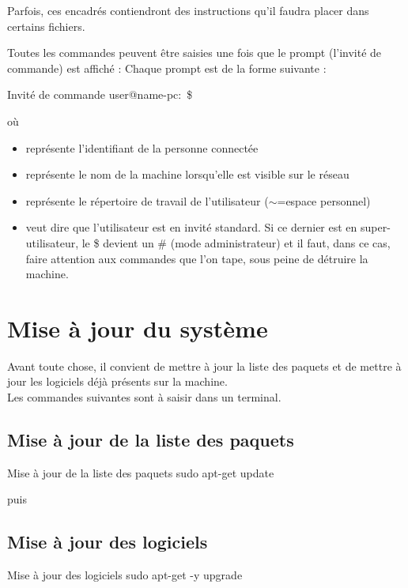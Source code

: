 Parfois, ces encadrés contiendront des instructions qu'il faudra placer dans certains fichiers.

Toutes les commandes peuvent être saisies une fois que le prompt (l’invité de commande) est affiché : 
Chaque prompt est de la forme suivante : \\
\begin{Bash}{Invité de commande}
user@name-pc:~\$ 
\end{Bash}


où 	

\begin{itemize}
    \item {} représente l’identifiant de la personne connectée
    \item {} représente le nom de la machine lorsqu’elle est visible sur le réseau
    \item \bold{$\sim$} représente le répertoire de travail de l’utilisateur ($\sim$=espace personnel)
    \item \bold{\$} veut dire que l'utilisateur est en invité standard. Si ce dernier est en  
super-utilisateur, le \$ devient un \# (mode administrateur) et il faut, dans ce cas, faire attention aux commandes que l’on tape, sous peine de détruire la machine.
\end{itemize}


\section{Mise à jour du système}

Avant toute chose, il convient de mettre à jour la liste des paquets et de mettre à jour les logiciels déjà présents sur la machine. \\
Les commandes suivantes sont à saisir dans un terminal.

\subsection{Mise à jour de la liste des paquets}

\begin{Bash}{Mise à jour de la liste des paquets}
sudo apt-get update
\end{Bash}

puis

\subsection{Mise à jour des logiciels}
\begin{Bash}{Mise à jour des logiciels}
sudo apt-get -y upgrade
\end{Bash}


